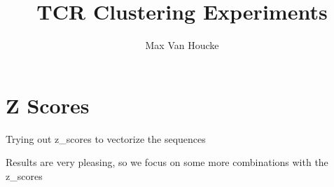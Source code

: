 \documentclass[11pt]{article}
\title{TCR Clustering Experiments}
\author{Max Van Houcke}
\date{}
\begin{document}
    \maketitle

    \section{Z Scores}

    Trying out z\_scores to vectorize the sequences

    \begin{figure}[H]
    \end{figure}

    Results are very pleasing, so we focus on some more combinations with the z\_scores
\end{document}
